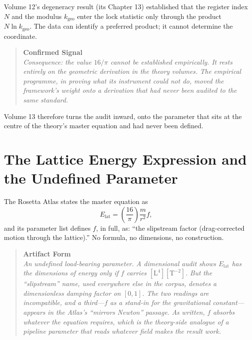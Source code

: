 \documentclass[11pt, letterpaper, openany]{book}
\begin{document}
Volume 12's degeneracy result (its Chapter 13) established that the register index $N$ and the modulus $k_{\text{geo}}$ enter the lock statistic only through the product $N \ln k_{\text{geo}}$. The data can identify a preferred product; it cannot determine the coordinate.

\begin{quote}
\textbf{Confirmed Signal} \\
\textit{Consequence: the value $16/\pi$ cannot be established empirically. It rests entirely on the geometric derivation in the theory volumes. The empirical programme, in proving what its instrument could not do, moved the framework's weight onto a derivation that had never been audited to the same standard.}
\end{quote}

Volume 13 therefore turns the audit inward, onto the parameter that sits at the centre of the theory's master equation and had never been defined.

\section{The Lattice Energy Expression and the Undefined Parameter}

The Rosetta Atlas states the master equation as
\begin{equation}
E_{\text{lat}} = \left(\frac{16}{\pi}\right) \frac{m}{r^2} f, \tag{3.1}
\end{equation}
and its parameter list defines $f$, in full, as: ``the slipstream factor (drag-corrected motion through the lattice).'' No formula, no dimensions, no construction.

\begin{quote}
\textbf{Artifact Form} \\
\textit{An undefined load-bearing parameter. A dimensional audit shows $E_{\text{lat}}$ has the dimensions of energy only if $f$ carries $[\mathrm{L}^4][\mathrm{T}^{-2}]$. But the ``slipstream'' name, used everywhere else in the corpus, denotes a dimensionless damping factor on $[0,1]$. The two readings are incompatible, and a third—$f$ as a stand-in for the gravitational constant—appears in the Atlas's ``mirrors Newton'' passage. As written, $f$ absorbs whatever the equation requires, which is the theory-side analogue of a pipeline parameter that reads whatever field makes the result work.}
\end{quote}

\end{document}
